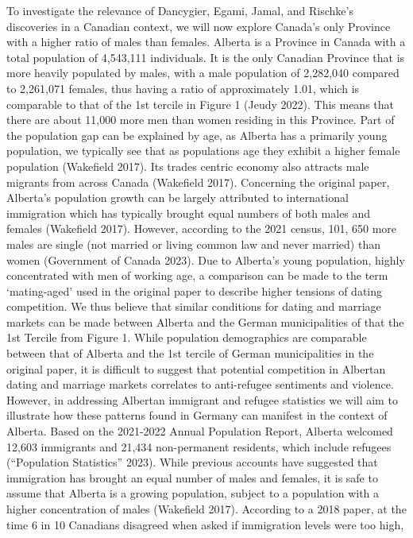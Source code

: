 \documentclass[
]{article}
\begin{document}
To investigate the relevance of Dancygier, Egami, Jamal, and Rischke's
discoveries in a Canadian context, we will now explore Canada's only
Province with a higher ratio of males than females. Alberta is a
Province in Canada with a total population of 4,543,111 individuals. It
is the only Canadian Province that is more heavily populated by males,
with a male population of 2,282,040 compared to 2,261,071 females, thus
having a ratio of approximately 1.01, which is comparable to that of the
1st tercile in Figure 1 (Jeudy 2022). This means that there are about
11,000 more men than women residing in this Province. Part of the
population gap can be explained by age, as Alberta has a primarily young
population, we typically see that as populations age they exhibit a
higher female population (Wakefield 2017). Its trades centric economy
also attracts male migrants from across Canada (Wakefield 2017).
Concerning the original paper, Alberta's population growth can be
largely attributed to international immigration which has typically
brought equal numbers of both males and females (Wakefield 2017).
However, according to the 2021 census, 101, 650 more males are single
(not married or living common law and never married) than women
(Government of Canada 2023). Due to Alberta's young population, highly
concentrated with men of working age, a comparison can be made to the
term `mating-aged' used in the original paper to describe higher
tensions of dating competition. We thus believe that similar conditions
for dating and marriage markets can be made between Alberta and the
German municipalities of that the 1st Tercile from Figure 1. While
population demographics are comparable between that of Alberta and the
1st tercile of German municipalities in the original paper, it is
difficult to suggest that potential competition in Albertan dating and
marriage markets correlates to anti-refugee sentiments and violence.
However, in addressing Albertan immigrant and refugee statistics we will
aim to illustrate how these patterns found in Germany can manifest in
the context of Alberta. Based on the 2021-2022 Annual Population Report,
Alberta welcomed 12,603 immigrants and 21,434 non-permanent residents,
which include refugees ({``Population Statistics''} 2023). While
previous accounts have suggested that immigration has brought an equal
number of males and females, it is safe to assume that Alberta is a
growing population, subject to a population with a higher concentration
of males (Wakefield 2017). According to a 2018 paper, at the time 6 in
10 Canadians disagreed when asked if immigration levels were too high,
\end{document}

